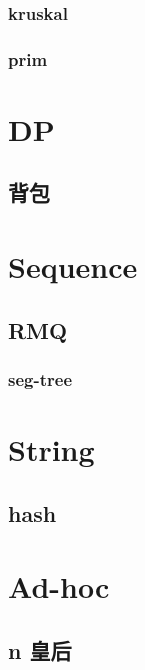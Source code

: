\subsubsection{kruskal}


\subsubsection{prim}


\section{DP}

\subsection{背包}


\section{Sequence}

\subsection{RMQ}

\subsubsection{seg-tree}


% 

\section{String}

\subsection{hash}


\section{Ad-hoc}

\subsection{n 皇后}
